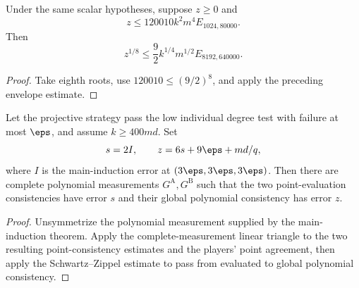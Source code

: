\begin{lemma}
\label{lem:main-formal-linear-triangle-scaled-eighth-root}
	\leanok
	Under the same scalar hypotheses, suppose $z\ge0$ and
	\[
		z\le120010k^2m^4E_{1024,80000}.
	\]
	Then
	\[
		z^{1/8}\le\frac92 k^{1/4}m^{1/2}E_{8192,640000}.
	\]
\end{lemma}
\begin{proof}
	\leanok
	Take eighth roots, use $120010\le(9/2)^8$, and apply the preceding envelope
	estimate.
\end{proof}

\begin{proposition}
\label{prop:main-formal-linear-triangle-complete-polynomial-construction}
	\leanok
	Let the projective strategy pass the low individual degree test with failure
	at most $\eps$, and assume $k\ge400md$.  Set
	\[
		s=2I,\qquad z=6s+9\eps+md/q,
	\]
	where $I$ is the main-induction error at $(3\eps,3\eps,3\eps)$.  Then there
	are complete polynomial measurements $G^{\mathrm A},G^{\mathrm B}$ such that
	the two point-evaluation consistencies have error $s$ and their global
	polynomial consistency has error $z$.
\end{proposition}
\begin{proof}
	\leanok
	Unsymmetrize the polynomial measurement supplied by the main-induction
	theorem.  Apply the complete-measurement linear triangle to the two resulting
	point-consistency estimates and the players' point agreement, then apply the
	Schwartz--Zippel estimate to pass from evaluated to global polynomial
	consistency.
\end{proof}

